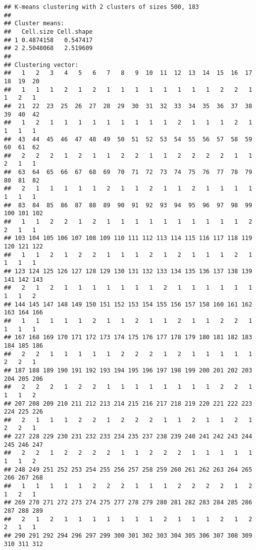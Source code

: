 \documentclass[
]{article}
\begin{document}
\begin{verbatim}
## K-means clustering with 2 clusters of sizes 500, 183
## 
## Cluster means:
##   Cell.size Cell.shape
## 1 0.4874158   0.547417
## 2 2.5048068   2.519609
## 
## Clustering vector:
##   1   2   3   4   5   6   7   8   9  10  11  12  13  14  15  16  17  18  19  20 
##   1   1   1   2   1   2   1   1   1   1   1   1   1   1   2   2   1   1   2   1 
##  21  22  23  25  26  27  28  29  30  31  32  33  34  35  36  37  38  39  40  42 
##   1   2   1   1   1   1   1   1   1   1   1   2   1   1   1   2   1   1   1   1 
##  43  44  45  46  47  48  49  50  51  52  53  54  55  56  57  58  59  60  61  62 
##   2   2   2   1   2   1   1   2   2   1   1   2   2   2   2   1   1   2   1   1 
##  63  64  65  66  67  68  69  70  71  72  73  74  75  76  77  78  79  80  81  82 
##   2   1   1   1   1   1   2   1   1   2   1   1   2   1   1   1   1   1   1   1 
##  83  84  85  86  87  88  89  90  91  92  93  94  95  96  97  98  99 100 101 102 
##   1   1   2   2   1   2   1   1   1   1   1   1   1   1   1   1   2   2   1   1 
## 103 104 105 106 107 108 109 110 111 112 113 114 115 116 117 118 119 120 121 122 
##   1   1   2   1   2   2   1   1   1   2   1   2   1   1   1   2   1   1   1   1 
## 123 124 125 126 127 128 129 130 131 132 133 134 135 136 137 138 139 141 142 143 
##   2   1   2   1   1   1   1   1   1   1   2   1   1   1   1   1   1   1   1   2 
## 144 145 147 148 149 150 151 152 153 154 155 156 157 158 160 161 162 163 164 166 
##   1   1   1   1   1   2   1   1   2   1   1   2   1   1   2   2   1   1   1   1 
## 167 168 169 170 171 172 173 174 175 176 177 178 179 180 181 182 183 184 185 186 
##   2   2   1   1   1   1   1   2   2   2   1   2   1   1   1   1   1   2   2   1 
## 187 188 189 190 191 192 193 194 195 196 197 198 199 200 201 202 203 204 205 206 
##   2   2   2   1   2   2   1   1   1   1   1   1   1   1   2   2   1   1   1   2 
## 207 208 209 210 211 212 213 214 215 216 217 218 219 220 221 222 223 224 225 226 
##   2   1   1   1   2   2   1   2   2   2   1   1   2   1   1   2   1   2   2   1 
## 227 228 229 230 231 232 233 234 235 237 238 239 240 241 242 243 244 245 246 247 
##   2   2   1   2   2   2   2   1   1   2   2   2   1   1   1   1   1   1   1   2 
## 248 249 251 252 253 254 255 256 257 258 259 260 261 262 263 264 265 266 267 268 
##   1   1   1   1   1   2   2   2   1   1   1   2   2   2   2   1   2   1   2   1 
## 269 270 271 272 273 274 275 277 278 279 280 281 282 283 284 285 286 287 288 289 
##   2   1   2   1   1   1   1   1   1   1   2   1   1   1   2   1   2   2   1   1 
## 290 291 292 294 296 297 299 300 301 302 303 304 305 306 307 308 309 310 311 312 

\end{verbatim}
\end{document}
